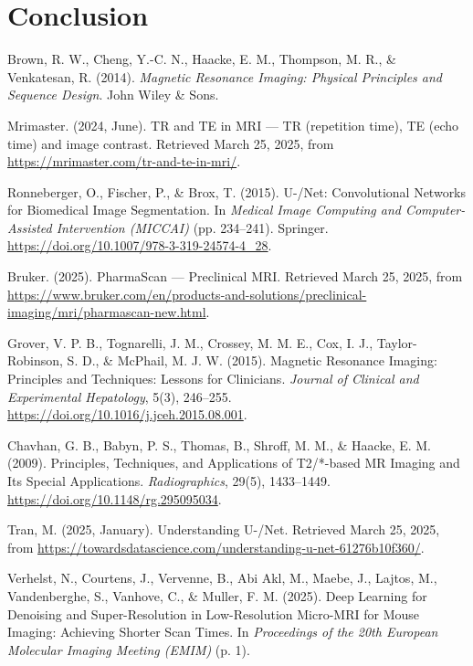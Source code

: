 \documentclass[twocolumn]{article}
\begin{document}
\section{Conclusion}

\newpage
\onecolumn
\nocite{*}
\begin{thebibliography}{99}

     Brown, R. W., Cheng, Y.-C. N., Haacke, E. M., Thompson, M. R., \& Venkatesan, R. (2014). \textit{Magnetic Resonance Imaging: Physical Principles and Sequence Design}. John Wiley \& Sons.
    
     Mrimaster. (2024, June). TR and TE in MRI — TR (repetition time), TE (echo time) and image contrast. Retrieved March 25, 2025, from \url{https://mrimaster.com/tr-and-te-in-mri/}.
    
     Ronneberger, O., Fischer, P., \& Brox, T. (2015). U-/Net: Convolutional Networks for Biomedical Image Segmentation. In \textit{Medical Image Computing and Computer-Assisted Intervention (MICCAI)} (pp. 234–241). Springer. \url{https://doi.org/10.1007/978-3-319-24574-4_28}.
    
     Bruker. (2025). PharmaScan — Preclinical MRI. Retrieved March 25, 2025, from \url{https://www.bruker.com/en/products-and-solutions/preclinical-imaging/mri/pharmascan-new.html}.
    
     Grover, V. P. B., Tognarelli, J. M., Crossey, M. M. E., Cox, I. J., Taylor-Robinson, S. D., \& McPhail, M. J. W. (2015). Magnetic Resonance Imaging: Principles and Techniques: Lessons for Clinicians. \textit{Journal of Clinical and Experimental Hepatology}, 5(3), 246–255. \url{https://doi.org/10.1016/j.jceh.2015.08.001}.
    
     Chavhan, G. B., Babyn, P. S., Thomas, B., Shroff, M. M., \& Haacke, E. M. (2009). Principles, Techniques, and Applications of T2/*-based MR Imaging and Its Special Applications. \textit{Radiographics}, 29(5), 1433–1449. \url{https://doi.org/10.1148/rg.295095034}.
    
     Tran, M. (2025, January). Understanding U-/Net. Retrieved March 25, 2025, from \url{https://towardsdatascience.com/understanding-u-net-61276b10f360/}.
    
     Verhelst, N., Courtens, J., Vervenne, B., Abi Akl, M., Maebe, J., Lajtos, M., Vandenberghe, S., Vanhove, C., \& Muller, F. M. (2025). Deep Learning for Denoising and Super-Resolution in Low-Resolution Micro-MRI for Mouse Imaging: Achieving Shorter Scan Times. In \textit{Proceedings of the 20th European Molecular Imaging Meeting (EMIM)} (p. 1).
    

\end{thebibliography}
\end{document}
